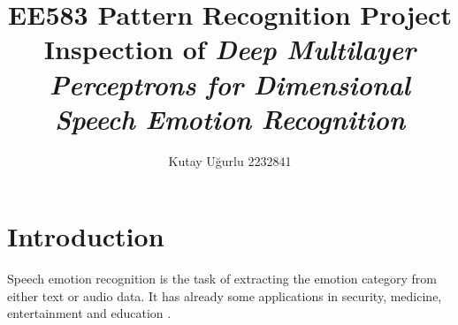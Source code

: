 \documentclass[a4paper,11pt]{article}
\author{Kutay U\u{g}urlu 2232841}
\begin{document}
    

\fancyfoot[C]{\thepage}

\title{\LARGE \LARGE EE583 Pattern Recognition Project \\ 
Inspection of \textit{Deep Multilayer Perceptrons for Dimensional Speech Emotion Recognition}}

\maketitle{\LARGE}
\pagebreak
\tableofcontents
\pagebreak

\section{Introduction}

Speech emotion recognition is the task of extracting the emotion category from either text or audio data. It has already some applications in security, medicine, entertainment and education \cite{cen2016real}. 
\end{document}
